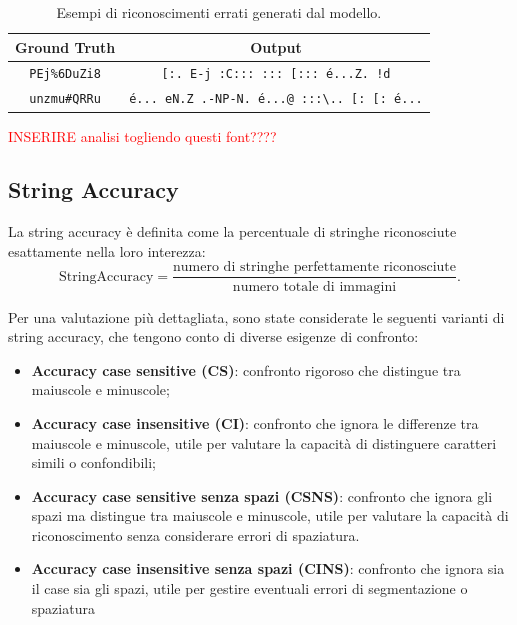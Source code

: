 \begin{table}[htbp]
    \centering
    \begin{tabular}{|c|c|}
        \hline
        \textbf{Ground Truth} & \textbf{Output} \\
        \hline
        \texttt{PEj\%6DuZi8} & \texttt{[:.\ E-j\ :C:::\ :::\ [:::\ é...Z.\ !d} \\
        \hline
        \texttt{unzmu\#QRRu} & \texttt{é...\ eN.Z\ .-NP-N.\ é...@\ :::\textbackslash..\ [:\ [:\ é...} \\
        \hline
    \end{tabular}
    \caption{Esempi di riconoscimenti errati generati dal modello.}
    \label{tab:recognition_examples}
\end{table}

\textcolor{red}{INSERIRE analisi togliendo questi font????}

\subsection{String Accuracy}
La string accuracy è definita come la percentuale di stringhe riconosciute esattamente nella loro interezza:
\[
    \mathrm{StringAccuracy} = \frac{\text{numero di stringhe perfettamente riconosciute}}{\text{numero totale di immagini}}.
\]

Per una valutazione più dettagliata, sono state considerate le seguenti varianti di string accuracy, che tengono conto di diverse esigenze di confronto:

\begin{itemize}
    \item \textbf{Accuracy case sensitive (CS)}: confronto rigoroso che distingue tra maiuscole e minuscole;
    \item \textbf{Accuracy case insensitive (CI)}: confronto che ignora le differenze tra maiuscole e minuscole, utile per valutare la capacità di distinguere caratteri simili o confondibili;
    \item \textbf{Accuracy case sensitive senza spazi (CSNS)}: confronto che ignora gli spazi ma distingue tra maiuscole e minuscole, utile per valutare la capacità di riconoscimento senza considerare errori di spaziatura.
    \item \textbf{Accuracy case insensitive senza spazi (CINS)}: confronto che ignora sia il case sia gli spazi, utile per gestire eventuali errori di segmentazione o spaziatura

\end{itemize}

